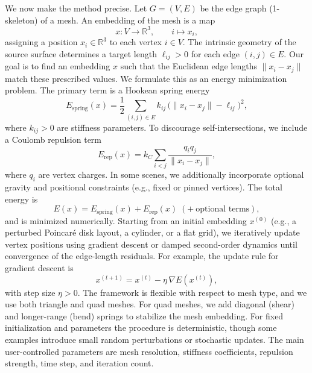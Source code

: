 \documentclass[letterpaper,11pt]{article}
\begin{document}
We now make the method precise. Let $G=(V,E)$ be the edge graph (1-skeleton) of a mesh. An embedding of the mesh is a map
\begin{equation*}
x : V \to \mathbb{R}^3, \qquad i \mapsto x_i,
\end{equation*}
assigning a position $x_i \in \mathbb{R}^3$ to each vertex $i \in V$. The intrinsic geometry of the source surface determines a target length $\ell_{ij} > 0$ for each edge $(i,j)\in E$. Our goal is to find an embedding $x$ such that the Euclidean edge lengths $\|x_i - x_j\|$ match these prescribed values. We formulate this as an energy minimization problem. The primary term is a Hookean spring energy
\begin{equation*}
E_{\mathrm{spring}}(x)
=
\frac{1}{2}
\sum_{(i,j)\in E}
k_{ij}\,\bigl(\|x_i - x_j\| - \ell_{ij}\bigr)^2,
\end{equation*}
where $k_{ij} > 0$ are stiffness parameters. To discourage self-intersections, we include a Coulomb repulsion term
\begin{equation*}
E_{\mathrm{rep}}(x)
=
k_C \sum_{i < j} \frac{q_i q_j}{\|x_i - x_j\|},
\end{equation*}
where $q_i$ are vertex charges. In some scenes, we additionally incorporate optional gravity and positional constraints (e.g., fixed or pinned vertices). The total energy is
\begin{equation*}
E(x) = E_{\mathrm{spring}}(x) + E_{\mathrm{rep}}(x) \; (+\ \text{optional terms}),
\end{equation*}
and is minimized numerically. Starting from an initial embedding $x^{(0)}$ (e.g., a perturbed Poincar\'e disk layout, a cylinder, or a flat grid), we iteratively update vertex positions using gradient descent or damped second-order dynamics until convergence of the edge-length residuals. For example, the update rule for gradient descent is
\begin{equation*}
x^{(t+1)} = x^{(t)} - \eta \,\nabla E(x^{(t)}),
\end{equation*}
with step size $\eta > 0$. The framework is flexible with respect to mesh type, and we use both triangle and quad meshes. For quad meshes, we add diagonal (shear) and longer-range (bend) springs to stabilize the mesh embedding. For fixed initialization and parameters the procedure is deterministic, though some examples introduce small random perturbations or stochastic updates. The main user-controlled parameters are mesh resolution, stiffness coefficients, repulsion strength, time step, and iteration count.
\end{document}
